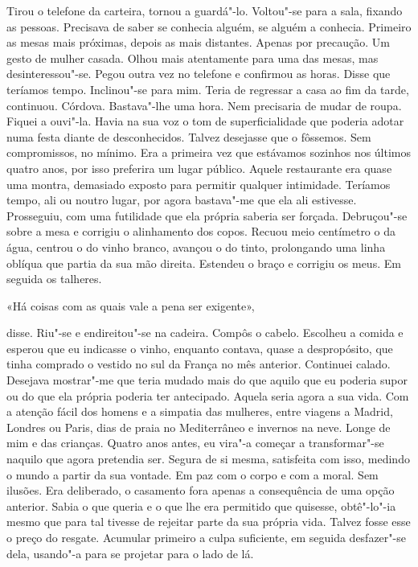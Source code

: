 Tirou o telefone da carteira, tornou a guardá"-lo. Voltou"-se para a
sala, fixando as pessoas. Precisava de saber se conhecia alguém, se
alguém a conhecia. Primeiro as mesas mais próximas, depois as mais
distantes. Apenas por precaução. Um gesto de mulher casada. Olhou mais
atentamente para uma das mesas, mas desinteressou"-se. Pegou outra vez
no telefone e confirmou as horas. Disse que teríamos tempo. Inclinou"-se
para mim. Teria de regressar a casa ao fim da tarde, continuou. Córdova.
Bastava"-lhe uma hora. Nem precisaria de mudar de roupa. Fiquei a
ouvi"-la. Havia na sua voz o tom de superficialidade que poderia adotar
numa festa diante de desconhecidos. Talvez desejasse que o fôssemos. Sem
compromissos, no mínimo. Era a primeira vez que estávamos sozinhos nos
últimos quatro anos, por isso preferira um lugar público. Aquele
restaurante era quase uma montra, demasiado exposto para permitir
qualquer intimidade. Teríamos tempo, ali ou noutro lugar, por agora
bastava"-me que ela ali estivesse. Prosseguiu, com uma futilidade que
ela própria saberia ser forçada. Debruçou"-se sobre a mesa e corrigiu o
alinhamento dos copos. Recuou meio centímetro o da água, centrou o do
vinho branco, avançou o do tinto, prolongando uma linha oblíqua que
partia da sua mão direita. Estendeu o braço e corrigiu os meus. Em
seguida os talheres.

«Há coisas com as quais vale a pena ser exigente»,

disse. Riu"-se e endireitou"-se na cadeira. Compôs o cabelo. Escolheu a
comida e esperou que eu indicasse o vinho, enquanto contava, quase a
despropósito, que tinha comprado o vestido no sul da França no mês
anterior. Continuei calado. Desejava mostrar"-me que teria mudado mais
do que aquilo que eu poderia supor ou do que ela própria poderia ter
antecipado. Aquela seria agora a sua vida. Com a atenção fácil dos
homens e a simpatia das mulheres, entre viagens a Madrid, Londres ou
Paris, dias de praia no Mediterrâneo e invernos na neve. Longe de mim e
das crianças. Quatro anos antes, eu vira"-a começar a transformar"-se
naquilo que agora pretendia ser. Segura de si mesma, satisfeita com
isso, medindo o mundo a partir da sua vontade. Em paz com o corpo e com
a moral. Sem ilusões. Era deliberado, o casamento fora apenas a
consequência de uma opção anterior. Sabia o que queria e o que lhe era
permitido que quisesse, obtê"-lo"-ia mesmo que para tal tivesse de
rejeitar parte da sua própria vida. Talvez fosse esse o preço do
resgate. Acumular primeiro a culpa suficiente, em seguida desfazer"-se
dela, usando"-a para se projetar para o lado de lá.

